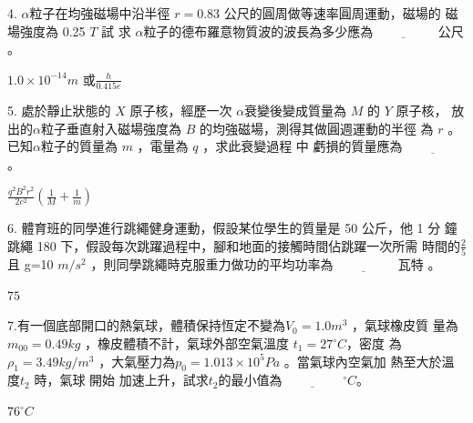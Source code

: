 \documentclass[cn,10pt,math=newtx]{elegantbook}
\begin{document}
\newpage


\begin{example}
   4. $\alpha$粒子在均強磁場中沿半徑 $r =0.83$ 公尺的圓周做等速率圓周運動，磁場的
磁場強度為 0.25 $T$ 試 求 $\alpha$粒子的德布羅意物質波的波長為多少應為$\underline{\hspace{2cm}}$
公尺 。\\
    \rightline{[復興高中教甄109]}
\end{example}
\begin{solution}
    $1.0\times10^{-14}m$ 或$\frac{h}{0.415e}$
\end{solution}

\newpage


\begin{example}
   5. 處於靜止狀態的 $X$ 原子核，經歷一次 $\alpha$衰變後變成質量為 $M$ 的 $Y$ 原子核，
放出的$\alpha$粒子垂直射入磁場強度為 $B$ 的均強磁場，測得其做圓週運動的半徑
為 $r$ 。已知$\alpha$粒子的質量為 $m$ ，電量為 $q$ ，求此衰變過程 中 虧損的質量應為$\underline{\hspace{2cm}}$
。\\
    \rightline{[復興高中教甄109]}
\end{example}
\begin{solution}
    $\frac{q^2 B^2 r^2}{2c^2}(\frac{1}{M}+\frac{1}{m})$
\end{solution}

\newpage


\begin{example}
   6. 體育班的同學進行跳繩健身運動，假設某位學生的質量是 50 公斤，他 1 分
鐘跳繩 180 下，假設每次跳躍過程中，腳和地面的接觸時間佔跳躍一次所需
時間的$\frac{2}{5}$且 g=10 $m/s^2$ ，則同學跳繩時克服重力做功的平均功率為$\underline{\hspace{2cm}}$
瓦特 。\\
    \rightline{[復興高中教甄109]}
\end{example}
\begin{solution}
    $75$
\end{solution}

\newpage


\begin{example}
   7.有一個底部開口的熱氣球，體積保持恆定不變為$V_0=1.0 m^3$ ，氣球橡皮質
量為 $m_00=0.49 kg$ ，橡皮體積不計，氣球外部空氣溫度 $t_1=27 ^\circ C $，密度
為 $\rho_1=3.49 kg/m^3$ ，大氣壓力為$p_0=1.013\times10^5 Pa$ 。當氣球內空氣加
熱至大於溫度$t_2$ 時，氣球 開始 加速上升，試求$t_2$的最小值為$\underline{\hspace{2cm}} ^\circ C$。\\
    \rightline{[復興高中教甄109]}
\end{example}
\begin{solution}
    $76 ^\circ C$
\end{solution}
\end{document}
